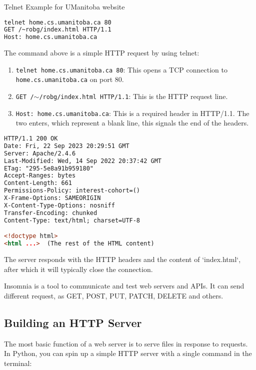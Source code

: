 \begin{example}{Telnet Example for UManitoba website}
\begin{lstlisting}[language=bash,caption=Telnet Message]
telnet home.cs.umanitoba.ca 80
GET /~robg/index.html HTTP/1.1
Host: home.cs.umanitoba.ca	
\end{lstlisting}

The command above is a simple HTTP request by using telnet:
\begin{enumerate}[label=\roman*),itemsep=1pt]
    \item \texttt{telnet home.cs.umanitoba.ca 80}:  This opens a TCP connection to \texttt{home.cs.umanitoba.ca} on port 80.
    \item \texttt{GET /$\sim$/robg/index.html HTTP/1.1}:  This is the HTTP request line.
    \item  \texttt{Host: home.cs.umanitoba.ca}:  This is a required header in HTTP/1.1.
The two enters, which represent a blank line, this signals the end of the headers.
\end{enumerate}

\begin{lstlisting}[language=html, caption=Response from the server]
HTTP/1.1 200 OK
Date: Fri, 22 Sep 2023 20:29:51 GMT
Server: Apache/2.4.6
Last-Modified: Wed, 14 Sep 2022 20:37:42 GMT
ETag: "295-5e8a91b959180"
Accept-Ranges: bytes
Content-Length: 661
Permissions-Policy: interest-cohort=()
X-Frame-Options: SAMEORIGIN
X-Content-Type-Options: nosniff
Transfer-Encoding: chunked
Content-Type: text/html; charset=UTF-8

<!doctype html>
<html ...>  (The rest of the HTML content)
\end{lstlisting}	


The server responds with the HTTP headers and the content of `index.html`, after which it will typically close the connection.
\end{example}

Insomnia is a tool to communicate and test web servers and APIs. It can send different request, as GET, POST, PUT, PATCH, DELETE and others.

\subsection{Building an HTTP Server}

The most basic function of a web server is to serve files in response to requests. In Python, you can spin up a simple HTTP server with a single command in the terminal:

